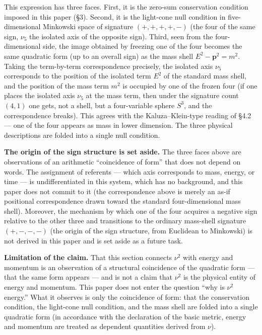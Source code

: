\documentclass[
]{article}
\begin{document}
This expression has three faces. First, it is the zero-sum conservation
condition imposed in this paper (§3). Second, it is the light-cone null
condition in five-dimensional Minkowski space of signature
\((+,+,+,+,-)\) (the four of the same sign, \(\nu_5\) the isolated axis
of the opposite sign). Third, seen from the four-dimensional side, the
image obtained by freezing one of the four becomes the same quadratic
form (up to an overall sign) as the mass shell
\(E^2-\boldsymbol{p}^2=m^2\). Taking the term-by-term correspondence
precisely, the isolated axis \(\nu_5\) corresponds to the position of
the isolated term \(E^2\) of the standard mass shell, and the position
of the mass term \(m^2\) is occupied by one of the frozen four (if one
places the isolated axis \(\nu_5\) at the mass term, then under the
signature count \((4,1)\) one gets, not a shell, but a four-variable
sphere \(S^3\), and the correspondence breaks). This agrees with the
Kaluza--Klein-type reading of §4.2 --- one of the four appears as mass
in lower dimension. The three physical descriptions are folded into a
single null condition.

\textbf{The origin of the sign structure is set aside.} The three faces
above are observations of an arithmetic ``coincidence of form'' that
does not depend on words. The assignment of referents --- which axis
corresponds to mass, energy, or time --- is undifferentiated in this
system, which has no background, and this paper does not commit to it
(the correspondence above is merely an as-if positional correspondence
drawn toward the standard four-dimensional mass shell). Moreover, the
mechanism by which one of the four acquires a negative sign relative to
the other three and transitions to the ordinary mass-shell signature
\((+,-,-,-)\) (the origin of the sign structure, from Euclidean to
Minkowski) is not derived in this paper and is set aside as a future
task.

\textbf{Limitation of the claim.} That this section connects \(\nu^2\)
with energy and momentum is an observation of a structural coincidence
of the quadratic form --- that the same form appears --- and is not a
claim that \(\nu^2\) is the physical entity of energy and momentum. This
paper does not enter the question ``why is \(\nu^2\) energy.'' What it
observes is only the coincidence of form: that the conservation
condition, the light-cone null condition, and the mass shell are folded
into a single quadratic form (in accordance with the declaration of the
basic metric, energy and momentum are treated as dependent quantities
derived from \(\nu\)).
\end{document}
